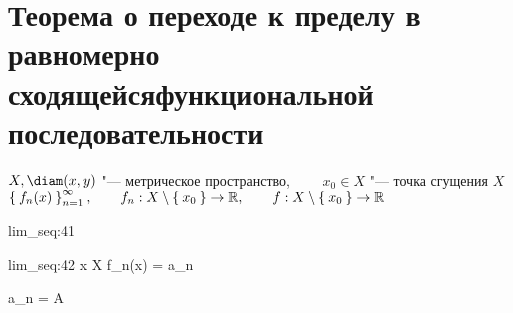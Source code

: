 \section{Теорема о переходе к пределу в равномерно сходящейся\n функциональной последовательности}

\begin{theorem}
	$ X, \diam(x, y) $ "--- метрическое пространство, $ \qquad x_0 \in X $ "--- точка сгущения $ X $ \\
	$ \Set{f_n(x)}_{n=1}^{\infty}, \qquad f_n : X \setminus \Set{x_0} \to \mathbb{R}, \qquad f : X \setminus \Set{x_0} \to \mathbb{R} $
	\begin{equ}{lim_seq:41}
		  
	\end{equ}
	\begin{equ}{lim_seq:42}
		\forall x \in X \setminus {} \quad \exist {} f_n(x) = a_n
	\end{equ}
	\begin{mequ}[\implies \empheqlbrace]
		 \exist {} a_n = A \in \R \\
		 \exist {}
	\end{mequ}
\end{theorem}

